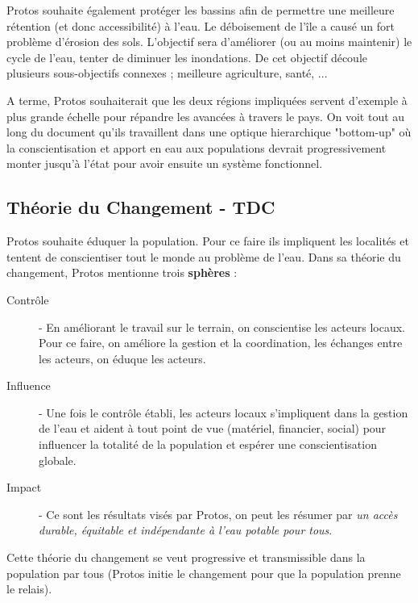 \documentclass[a4paper, 11pt]{article}
\begin{document}
Protos souhaite également protéger les bassins afin de permettre une meilleure rétention (et donc accessibilité) à l'eau. Le déboisement de l'île a causé un fort problème d'érosion des sols. L'objectif sera d'améliorer (ou au moins maintenir) le cycle de l'eau, tenter de diminuer les inondations. De cet objectif découle plusieurs sous-objectifs connexes ; meilleure agriculture, santé, ...

A terme, Protos souhaiterait que les deux régions impliquées servent d'exemple à plus grande échelle pour répandre les avancées à travers le pays. On voit tout au long du document qu'ils travaillent dans une optique hierarchique "bottom-up" où la conscientisation et apport en eau aux populations devrait progressivement monter jusqu'à l'état pour avoir ensuite un système fonctionnel.

\subsection*{Théorie du Changement - TDC}
Protos souhaite éduquer la population. Pour ce faire ils impliquent les localités et tentent de conscientiser tout le monde au problème de l'eau. Dans sa théorie du changement, Protos mentionne trois \textbf{sphères} :
\begin{description}
  \item[Contrôle] - En améliorant le travail sur le terrain, on conscientise les acteurs locaux. Pour ce faire, on améliore la gestion et la coordination, les échanges entre les acteurs, on éduque les acteurs.
  \item[Influence] - Une fois le contrôle établi, les acteurs locaux s'impliquent dans la gestion de l'eau et aident à tout point de vue (matériel, financier, social) pour influencer la totalité de la population et espérer une conscientisation globale.
  \item[Impact] - Ce sont les résultats visés par Protos, on peut les résumer par \textit{un accès durable, équitable et indépendante à l'eau potable pour tous}.
\end{description}

Cette théorie du changement se veut progressive et transmissible dans la population par tous (Protos initie le changement pour que la population prenne le relais).
\end{document}

